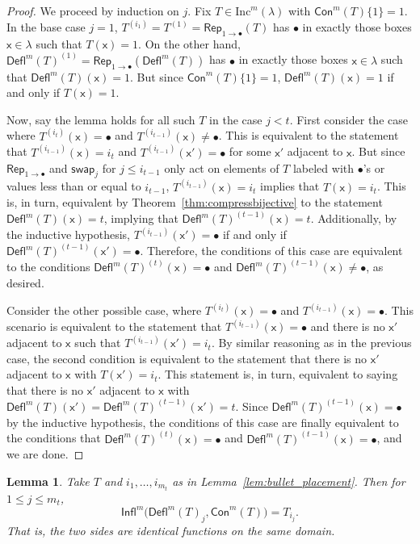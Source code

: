 \documentclass[12pt]{amsart}
\newcommand{\x}{\ensuremath{\mathsf{x}}}
\newtheorem{lemma}[theorem]{Lemma}
\theoremstyle{definition}
\theoremstyle{remark}
\numberwithin{equation}{section}
\newcommand{\inc}{\ensuremath{\mathrm{Inc}}}
\newcommand{\swap}{\ensuremath{\mathsf{swap}}}
\newcommand{\rep}{\ensuremath{\mathsf{Rep}}}
\newcommand{\deflate}{\ensuremath{\mathsf{Defl}}}
\newcommand{\tinflate}{\ensuremath{\mathsf{Infl}}}
\newcommand{\content}{\ensuremath{\mathsf{Con}}}
\begin{document}
\begin{proof} We proceed by induction on $j$. Fix $T \in \inc^m(\lambda)$  with $\content^m(T) \lbrace 1 \rbrace = 1$. In the base case $j = 1$,  $T^{(i_1)} = T^{(1)} = \rep_{1 \rightarrow \bullet}(T)$ has $\bullet$ in exactly those boxes $\x \in \lambda$ such that $T(\x) = 1$. On the other hand, $\deflate^m(T)^{(1)} =  \rep_{1 \rightarrow \bullet}(\deflate^m(T))$ has $\bullet$ in exactly those boxes $\x \in \lambda$ such that $\deflate^m(T)(\x) = 1$. But since $\content^m(T) \lbrace 1 \rbrace = 1$, $\deflate^m(T)(\x) = 1$ if and only if $T(\x) = 1$. 


Now, say the lemma holds for all such $T$ in the case $j < t$. First consider the case where $T^{(i_t)}(\x) = \bullet$ and $T^{(i_{t-1})}(\x) \neq \bullet$. This is equivalent to the statement that $T^{(i_{t-1})}(\x) = i_t$ and $T^{(i_{t-1})}(\x') = \bullet$ for some $\x'$ adjacent to $\x$. But since $\rep_{1 \rightarrow \bullet}$ and $\swap_j$ for  $j \leq i_{t-1}$ only act on elements of $T$ labeled with $\bullet$'s or values less than or equal to $i_{t-1}$, $T^{(i_{t-1})}(\x) = i_t$ implies that $T(\x) = i_t$. This is, in turn, equivalent by Theorem~\ref{thm:compressbijective} to the statement $\deflate^m(T)(\x) = t$, implying that $\deflate^m(T)^{(t-1)}(\x) = t$. Additionally, by the inductive hypothesis, $T^{(i_{t-1})}(\x') = \bullet$ if and only if $\deflate^m(T)^{(t-1)}(\x') = \bullet$. Therefore, the conditions of this case are equivalent to the conditions $\deflate^m(T)^{(t)}(\x) = \bullet$ and $\deflate^m(T)^{(t-1)}(\x) \neq \bullet$, as desired. 

Consider the other possible case, where $T^{(i_t)}(\x) = \bullet$ and $T^{(i_{t-1})}(\x) = \bullet$. This scenario is equivalent to the statement that $T^{(i_{t-1})}(\x) = \bullet$ and there is no $\x'$ adjacent to $\x$ such that $T^{(i_{t-1})}(\x') = i_t$. By similar reasoning as in the previous case, the second condition is equivalent to the statement that there is no $\x'$ adjacent to $\x$ with $T(\x') = i_t$. This statement is, in turn, equivalent to saying that there is no $\x'$ adjacent to $\x$ with $\deflate^m(T)(\x') = \deflate^m(T)^{(t-1)}(\x') = t$. Since $\deflate^m(T)^{(t-1)}(\x) = \bullet$ by the inductive hypothesis, the conditions of this case are finally equivalent to the conditions that $\deflate^m(T)^{(t)}(\x) = \bullet$ and $\deflate^m(T)^{(t-1)}(\x) = \bullet$, and we are done.
\end{proof}
\begin{lemma} \label{lem:gappy_promotion}
Take $T$ and $i_1, \ldots, i_{m_t}$ as in Lemma~\ref{lem:bullet_placement}. Then for $1 \leq j \leq m_t$, 
\begin{equation}\label{eq:gappy_promotion}
 \tinflate^m \Big( \deflate^m(T)_j, \content^m(T) \Big) = T_{i_j}.
\end{equation}
That is, the two sides are identical functions on the same domain. 
\end{lemma}
\end{document}
